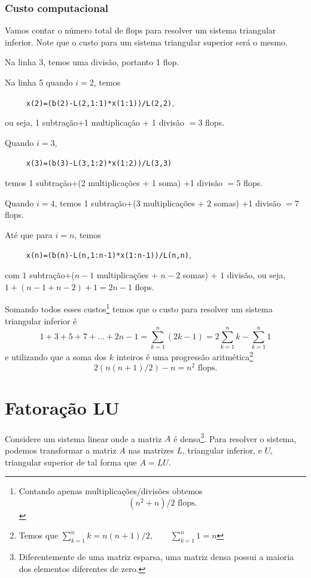 \subsubsection{Custo computacional}
Vamos contar o número total de flops para resolver um sistema triangular inferior. Note que o custo para um sistema triangular superior será o mesmo.

Na linha 3, temos uma divisão, portanto 1 flop.

Na linha 5 quando $i=2$, temos

\verb#     x(2)=(b(2)-L(2,1:1)*x(1:1))/L(2,2)#,

ou seja, 1 subtração+1 multiplicação + 1 divisão $=3$ flops.

Quando $i=3$,

\verb#     x(3)=(b(3)-L(3,1:2)*x(1:2))/L(3,3)#

temos 1 subtração+(2 multiplicações + 1 soma) +1 divisão $=5$ flops.

Quando $i=4$, temos 1 subtração+(3 multiplicações + 2 somas) +1 divisão $=7$ flops.

Até que para $i=n$, temos

\verb#     x(n)=(b(n)-L(n,1:n-1)*x(1:n-1))/L(n,n)#,

com $1$ subtração+($n-1$ multiplicações + $n-2$ somas) + $1$ divisão, ou seja, $1+(n-1+n-2)+1=2n-1$ flops.

Somando todos esses custos\footnote{Contando apenas multiplicações/divisões obtemos
\begin{equation}
  (n^2+n)/2  \text{~flops}.
\end{equation}} temos que o custo para resolver um sistema triangular inferior é
\begin{equation}
  1 +3+5+7+...+2n-1=  \sum_{k=1}^n(2k-1) = 2 \sum_{k=1}^nk -\sum_{k=1}^n1
\end{equation}
e utilizando que a soma dos $k$ inteiros é uma progressão aritmética\footnote{Temos que $\displaystyle \sum_{k=1}^n k =n(n+1)/2, \quad\quad \sum_{k=1}^n 1=n$}
\begin{equation}
  2 ( n(n+1)/2 ) -n=  n^2 \text{~flops}.
\end{equation}







\section{Fatoração LU}
Considere um sistema linear onde a matriz $A$ é densa\footnote{Diferentemente de uma matriz esparsa, uma matriz densa possui a maioria dos elementos diferentes de zero.}. Para resolver o sistema, podemos transformar a matriz $A$ nas matrizes $L$, triangular inferior, e $U$, triangular superior de tal forma que $A=LU$.

